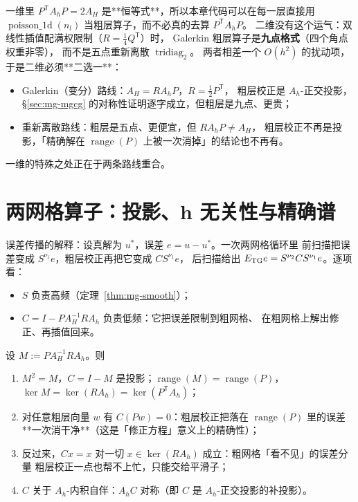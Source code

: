 \begin{remark}
一维里 $P^{\mathsf T}A_hP=2A_H$ 是**恒等式**，所以本章代码可以在每一层直接用
$\operatorname{poisson\_1d}(n_l)$ 当粗层算子，而不必真的去算 $P^{\mathsf T}A_hP$。
二维没有这个运气：双线性插值配满权限制（$R=\frac14Q^{\mathsf T}$）时，
Galerkin 粗层算子是\textbf{九点格式}（四个角点权重非零），
而不是五点重新离散 $\operatorname{tridiag}_2$。
两者相差一个 $O(h^2)$ 的扰动项，于是二维必须**二选一**：
\begin{itemize}
  \item Galerkin（变分）路线：$A_H=RA_hP$，$R=\frac12P^{\mathsf T}$，
        粗层校正是 $A_h$-正交投影，\S\ref{sec:mg-mgcg} 的对称性证明逐字成立，但粗层是九点、更贵；
  \item 重新离散路线：粗层是五点、更便宜，但 $RA_hP\ne A_H$，
        粗层校正不再是投影，「精确解在 $\operatorname{range}(P)$ 上被一次消掉」的结论也不再有。
\end{itemize}
一维的特殊之处正在于两条路线重合。
\end{remark}

\section{两网格算子：投影、h 无关性与精确谱}
\label{sec:mg-tg}

误差传播的解释：设真解为 $u^\ast$，误差 $e=u-u^\ast$。一次两网格循环里
前扫描把误差变成 $S^{\nu_1}e$，粗层校正再把它变成 $C S^{\nu_1}e$，
后扫描给出 $E_{\rm TG}e=S^{\nu_2}CS^{\nu_1}e$。逐项看：
\begin{itemize}
  \item $S$ 负责高频（定理~\ref{thm:mg-smooth}）；
  \item $C=I-PA_H^{-1}RA_h$ 负责低频：它把误差限制到粗网格、
        在粗网格上解出修正、再插值回来。
\end{itemize}

\begin{lemma}
\label{lem:mg-cgc-projection}
设 $M:=PA_H^{-1}RA_h$。则
\begin{enumerate}
  \item $M^2=M$，$C=I-M$ 是投影；$\operatorname{range}(M)=\operatorname{range}(P)$，
        $\ker M=\ker(RA_h)=\ker(P^{\mathsf T}A_h)$；
  \item 对任意粗层向量 $w$ 有 $C(Pw)=0$：粗层校正把落在
        $\operatorname{range}(P)$ 里的误差**一次消干净**（这是「修正方程」意义上的精确性）；
  \item 反过来，$Cx=x$ 对一切 $x\in\ker(RA_h)$ 成立：粗网格「看不见」的误差分量
        粗层校正一点也帮不上忙，只能交给平滑子；
  \item $C$ 关于 $A_h$-内积自伴：$A_hC$ 对称（即 $C$ 是 $A_h$-正交投影的补投影）。
\end{enumerate}
\end{lemma}

